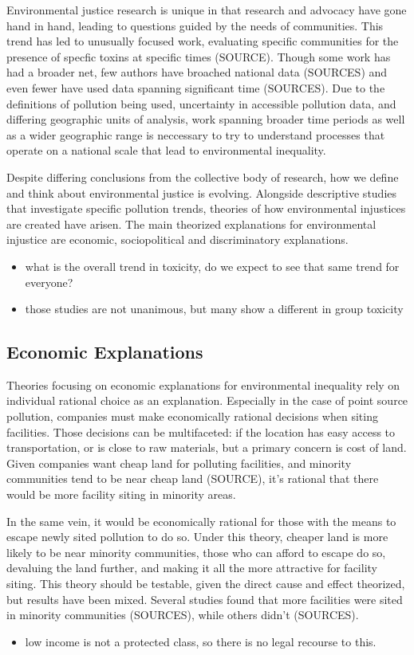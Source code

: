 \documentclass[12pt,twoside]{dukestatscithesis}
\providecommand{\tightlist}{%
  \setlength{\itemsep}{0pt}\setlength{\parskip}{0pt}}
\theoremstyle{definition}
\theoremstyle{definition}
\theoremstyle{definition}
\theoremstyle{remark}
\begin{document}
Environmental justice research is unique in that research and advocacy
have gone hand in hand, leading to questions guided by the needs of
communities. This trend has led to unusually focused work, evaluating
specific communities for the presence of specfic toxins at specific
times (SOURCE). Though some work has had a broader net, few authors have
broached national data (SOURCES) and even fewer have used data spanning
significant time (SOURCES). Due to the definitions of pollution being
used, uncertainty in accessible pollution data, and differing geographic
units of analysis, work spanning broader time periods as well as a wider
geographic range is neccessary to try to understand processes that
operate on a national scale that lead to environmental inequality.

Despite differing conclusions from the collective body of research, how
we define and think about environmental justice is evolving. Alongside
descriptive studies that investigate specific pollution trends, theories
of how environmental injustices are created have arisen. The main
theorized explanations for environmental injustice are economic,
sociopolitical and discriminatory explanations.
\begin{itemize}
\tightlist
\item
  what is the overall trend in toxicity, do we expect to see that same
  trend for everyone?
\item
  those studies are not unanimous, but many show a different in group
  toxicity
\end{itemize}
\subsection{Economic Explanations}\label{economic-explanations}

Theories focusing on economic explanations for environmental inequality
rely on individual rational choice as an explanation. Especially in the
case of point source pollution, companies must make economically
rational decisions when siting facilities. Those decisions can be
multifaceted: if the location has easy access to transportation, or is
close to raw materials, but a primary concern is cost of land. Given
companies want cheap land for polluting facilities, and minority
communities tend to be near cheap land (SOURCE), it's rational that
there would be more facility siting in minority areas.

In the same vein, it would be economically rational for those with the
means to escape newly sited pollution to do so. Under this theory,
cheaper land is more likely to be near minority communities, those who
can afford to escape do so, devaluing the land further, and making it
all the more attractive for facility siting. This theory should be
testable, given the direct cause and effect theorized, but results have
been mixed. Several studies found that more facilities were sited in
minority communities (SOURCES), while others didn't (SOURCES).
\begin{itemize}
\tightlist
\item
  low income is not a protected class, so there is no legal recourse to
  this.
\end{itemize}
\end{document}
